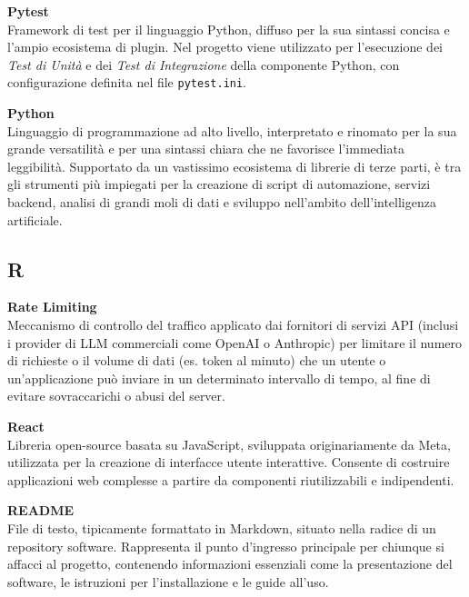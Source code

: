 \documentclass[12pt, a4paper]{article}
\begin{document}
\noindent\hypertarget{pytest}{\textbf{Pytest}} \\[0.1em]
Framework di test per il linguaggio Python, diffuso per la sua sintassi concisa e l'ampio ecosistema di plugin. Nel progetto viene utilizzato per l'esecuzione dei \textit{Test di Unità} e dei \textit{Test di Integrazione} della componente Python, con configurazione definita nel file \texttt{pytest.ini}.
\vspace{0.5cm}

\noindent\hypertarget{python}{\textbf{Python}} \\[0.1em]
Linguaggio di programmazione ad alto livello, interpretato e rinomato per la sua grande versatilità e per una sintassi chiara che ne favorisce l'immediata leggibilità. Supportato da un vastissimo ecosistema di librerie di terze parti, è tra gli strumenti più impiegati per la creazione di script di automazione, servizi backend, analisi di grandi moli di dati e sviluppo nell'ambito dell'intelligenza artificiale.
\vspace{0.1cm}

\newpage
\subsection*{R}
{}
\vspace{0.2cm}

\noindent\hypertarget{rate-limiting}{\textbf{Rate Limiting}} \\[0.1em]
Meccanismo di controllo del traffico applicato dai fornitori di servizi API (inclusi i provider di LLM commerciali come OpenAI o Anthropic) per limitare il numero di richieste o il volume di dati (es. token al minuto) che un utente o un'applicazione può inviare in un determinato intervallo di tempo, al fine di evitare sovraccarichi o abusi del server.
\vspace{0.5cm}

\noindent\hypertarget{react}{\textbf{React}} \\[0.1em]
Libreria open-source basata su JavaScript, sviluppata originariamente da Meta, utilizzata per la creazione di interfacce utente interattive. Consente di costruire applicazioni web complesse a partire da componenti riutilizzabili e indipendenti.
\vspace{0.5cm}

\noindent\hypertarget{readme}{\textbf{README}} \\[0.1em]
File di testo, tipicamente formattato in Markdown, situato nella radice di un repository software. Rappresenta il punto d'ingresso principale per chiunque si affacci al progetto, contenendo informazioni essenziali come la presentazione del software, le istruzioni per l'installazione e le guide all'uso.
\vspace{0.5cm}
\end{document}
